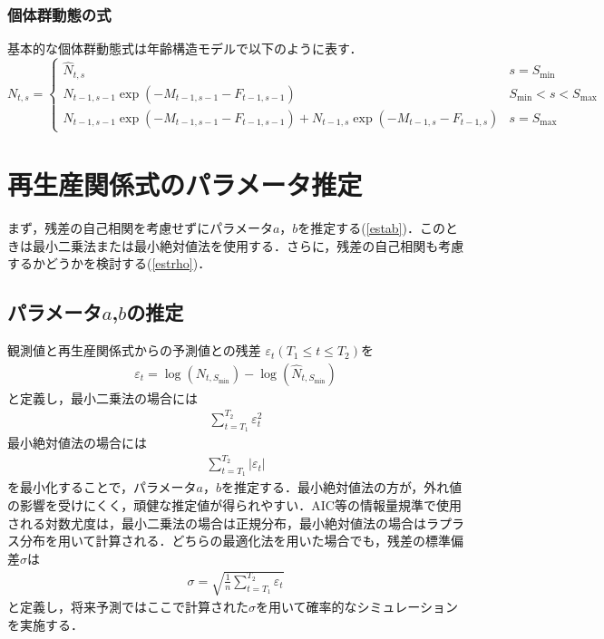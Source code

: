 \documentclass[11pt]{jsarticle}
\begin{document}
\subsubsection*{個体群動態の式}
基本的な個体群動態式は年齢構造モデルで以下のように表す．
\begin{equation}
  N_{t,s} = \begin{cases}
      \hat{N}_{t, s}  &     s = S_\mathrm{min} \\    
      N_{t-1, s-1}  \exp(-M_{t-1,s-1}-F_{t-1,s-1} )  &    S_\mathrm{min} < s < S_\mathrm{max} \\
      N_{t-1, s-1}  \exp(-M_{t-1,s-1}-F_{t-1,s-1} ) + N_{t-1, s}  \exp(-M_{t-1,s}-F_{t-1,s}) &   s=S_{\mathrm{max}}
  \end{cases}
  \label{future_eq}
\end{equation}

\section{再生産関係式のパラメータ推定}
まず，残差の自己相関を考慮せずにパラメータ$a$，$b$を推定する(\ref{estab})．このときは最小二乗法または最小絶対値法を使用する．さらに，残差の自己相関も考慮するかどうかを検討する(\ref{estrho})．
\subsection{パラメータ$a$,$b$の推定\label{estab}}
観測値と再生産関係式からの予測値との残差 $\varepsilon_t (T_1 \leq t \leq T_2)$を
\begin{eqnarray}
  \varepsilon_t = \log (N_{t,S_{\mathrm{min}}}) - \log (\hat{N}_{t,S_{\mathrm{min}}}) 
\end{eqnarray}
と定義し，最小二乗法の場合には
\begin{eqnarray}
  \sum_{t=T_1}^{T_2} \varepsilon_t^2
\end{eqnarray}
最小絶対値法の場合には
\begin{eqnarray}
  \sum_{t=T_1}^{T_2} | \varepsilon_t |
\end{eqnarray}
を最小化することで，パラメータ$a$，$b$を推定する．最小絶対値法の方が，外れ値の影響を受けにくく，頑健な推定値が得られやすい．AIC等の情報量規準で使用される対数尤度は，最小二乗法の場合は正規分布，最小絶対値法の場合はラプラス分布を用いて計算される．どちらの最適化法を用いた場合でも，残差の標準偏差$\sigma$は
\begin{eqnarray}
  \sigma = \sqrt{\frac{1}{n} \sum_{t=T_1}^{T_2} \varepsilon_t}
\end{eqnarray}
と定義し，将来予測ではここで計算された$\sigma$を用いて確率的なシミュレーションを実施する．
\end{document}
